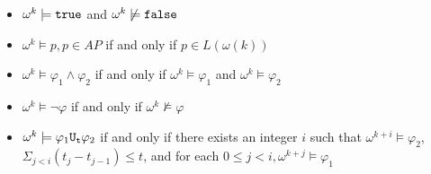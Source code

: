 \documentclass{llncs}
\begin{document}
\begin{itemize}
\renewcommand{\labelitemi}{$\bullet$}
\item $\omega^k \models \begin{tt}true\end{tt}$ and $\omega^k \not \models \begin{tt}false\end{tt}$
\item $\omega^{k} \models p, p \in AP$ if and only if $p \in L(\omega(k))$
\item $\omega^{k} \models \varphi_1 \wedge \varphi_2$ if and only if $\omega^k \models \varphi_1$ and $\omega^k \models \varphi_2$
\item $\omega^k \models \neg \varphi$ if and only if $\omega^k \not \models \varphi$
\item $\omega^k \models \varphi_1 \begin{tt}U_{t}\end{tt} \varphi_2$ if and only if there exists an integer $i$ such that $\omega^{k+i} \models \varphi_2$, $\Sigma_{j < i}(t_j - t_{j-1}) \leq t$, and for each $0 \leq j < i, \omega^{k+j} \models \varphi_1$
\end{itemize} 
\end{document}
